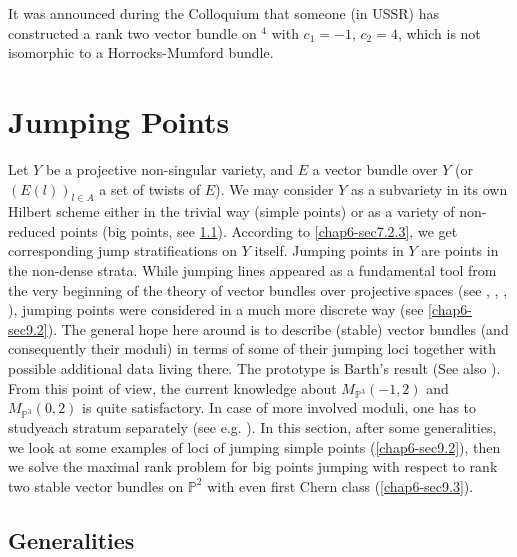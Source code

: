 \begin{remark*}
It was announced during the Colloquium that someone (in USSR) has
constructed a rank two vector bundle on $^{4}$ with $c_{1}=-1$,
$c_{2}=4$, which is not isomorphic to a Horrocks-Mumford bundle. 
\end{remark*}

\section{Jumping Points}\label{chap6-sec9}

Let $Y$ be a projective non-singular variety, and $E$ a vector bundle
over $Y$ (or $(E(l))_{l\in A}$ a set of twists of $E$). We may
consider $Y$ as a subvariety in its own Hilbert scheme either in the
trivial way (simple points) or as a variety of non-reduced points (big
points, see \ref{chap6-sec9.1}). According to \ref{chap6-sec7.2.3}, we
get corresponding jump stratifications on $Y$ itself. Jumping points
in $Y$ are points in the non-dense strata. While jumping lines
appeared as a fundamental tool from the very beginning of the theory
of vector bundles over projective spaces
(see \cite{chap6-Schw}, \cite{chap6-VdV}, \cite{chap6-BV1}, \cite{chap6-BV2}),
jumping points were considered in a much more discrete way
(see \ref{chap6-sec9.2}). The general hope here around is to describe
(stable) vector  bundles (and consequently their moduli) in terms of
some of their jumping loci together with possible additional data
living there. The prototype is Barth's
result \cite[\S\ 2.3.4]{chap6-B3} (See
also \cite[\S\ 7.2, 7.3]{chap6-Hu1}). From this point of view, the
current knowledge about $M_{\mathbb{P}^{3}}(-1,2)$ \cite{chap6-HS} and
$M_{\mathbb{P}^{3}}(0,2)$ \cite{chap6-H3} is quite satisfactory. In
case of more involved moduli, one has to study\pageoriginale each
stratum separately (see e.g. \cite{chap6-BM}). In this section, after
some generalities, we look at some examples of loci of jumping simple
points (\ref{chap6-sec9.2}), then we solve the maximal rank problem
for big points jumping with respect to rank two stable vector bundles
on $\mathbb{P}^{2}$ with even first Chern class (\ref{chap6-sec9.3}).

\subsection{Generalities}\label{chap6-sec9.1}

